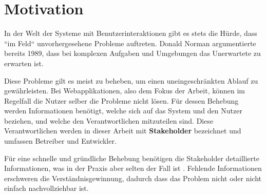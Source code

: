 \section{Motivation}


In der Welt der Systeme mit Benutzerinteraktionen gibt es stets die Hürde, dass ``im Feld`` unvorhergesehene Probleme auftreten. Donald Norman \cite{TheProblemOfAutomation} argumentierte bereits 1989, dass bei komplexen Aufgaben und Umgebungen das Unerwartete zu erwarten ist. %

Diese Probleme gilt es meist zu beheben, um einen uneingeschränkten Ablauf zu gewährleisten. Bei Webapplikationen, also dem Fokus der Arbeit, können im Regelfall die Nutzer selber die Probleme nicht lösen. Für dessen Behebung werden Informationen benötigt, welche sich auf das System und den Nutzer beziehen, und welche den Verantwortlichen mitzuteilen sind. Diese Verantwortlichen werden in dieser Arbeit mit \textbf{Stakeholder} bezeichnet und umfassen Betreiber und Entwickler.

Für eine schnelle und gründliche Behebung benötigen die Stakeholder detaillierte Informationen, was in der Praxis aber selten der Fall ist \cite{AnErrorReportingAndFeedbackComponent}. Fehlende Informationen erschweren die Verständnisgewinnung, dadurch dass das Problem nicht oder nicht einfach nachvollziehbar ist.



